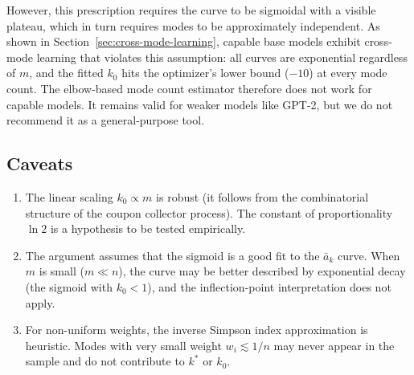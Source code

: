 However, this prescription requires the curve to be sigmoidal with a visible plateau, which in turn requires modes to be approximately independent.
As shown in Section~\ref{sec:cross-mode-learning}, capable base models exhibit cross-mode learning that violates this assumption: all curves are exponential regardless of $m$, and the fitted $k_0$ hits the optimizer's lower bound ($-10$) at every mode count.
The elbow-based mode count estimator therefore does not work for capable models.
It remains valid for weaker models like GPT-2, but we do not recommend it as a general-purpose tool.

\subsection{Caveats}

\begin{enumerate}
    \item The linear scaling $k_0 \propto m$ is robust (it follows from the combinatorial structure of the coupon collector process).
The constant of proportionality $\ln 2$ is a hypothesis to be tested empirically.

    \item The argument assumes that the sigmoid is a good fit to the $\bar{a}_k$ curve.
When $m$ is small ($m \ll n$), the curve may be better described by exponential decay (the sigmoid with $k_0 < 1$), and the inflection-point interpretation does not apply.

    \item For non-uniform weights, the inverse Simpson index approximation is heuristic.
Modes with very small weight $w_i \lesssim 1/n$ may never appear in the sample and do not contribute to $k^*$ or $k_0$.
\end{enumerate}

